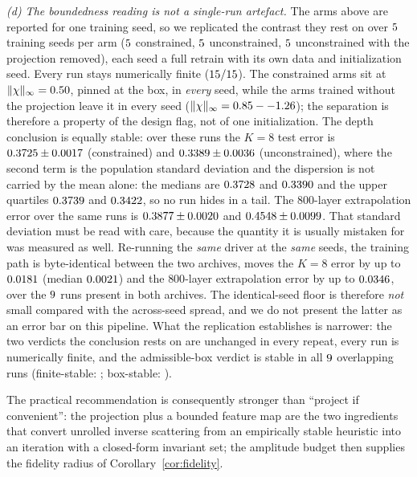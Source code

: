 \documentclass[journal,cmes,article,submit,moreauthors,pdftex]{Definitions/tsp}
\newcommand{\infn}[1]{\lVert #1 \rVert_{\infty}}
\newcommand{\numv}[1]{#1}
\begin{document}
\emph{(d) The boundedness reading is not a single-run artefact.} The arms above are reported for one
training seed, so we replicated the contrast they rest on over
$\numv{\NumSeedNCons}$ training seeds per arm ($\numv{\NumSeedNCons}$ constrained,
$\numv{\NumSeedNUnc}$ unconstrained, $\numv{\NumSeedNProjOff}$ unconstrained with the projection
removed), each seed a full retrain with its own data and initialization seed. Every run stays
numerically finite ($\numv{\NumSeedFinite}$). The constrained arms sit at
$\infn{\chi}=\numv{\NumSeedChiConsMax}$, pinned at the box, in \emph{every} seed, while the
arms trained without the projection leave it in every seed
($\infn{\chi}=\numv{\NumSeedProjOffBox}$); the separation is therefore a property of the design
flag, not of one initialization. The depth conclusion is equally stable: over these runs the
$K{=}8$ test error is $\numv{\NumSeedRreMeanCons}\pm\numv{\NumSeedRreSdCons}$ (constrained) and
$\numv{\NumSeedRreMeanUnc}\pm\numv{\NumSeedRreSdUnc}$ (unconstrained), where the second term is
the population standard deviation and the dispersion is not carried by the mean alone: the
medians are $\numv{\NumSeedRreMedCons}$ and $\numv{\NumSeedRreMedUnc}$ and the upper quartiles
$\numv{\NumSeedRreHiCons}$ and $\numv{\NumSeedRreHiUnc}$, so no run hides in a tail. The
$800$-layer extrapolation error over the same runs is
$\numv{\NumSeedExMeanCons}\pm\numv{\NumSeedExSdCons}$ and
$\numv{\NumSeedExMeanUnc}\pm\numv{\NumSeedExSdUnc}$. That standard deviation must be read with care, because the quantity it is usually mistaken for was measured as well. Re-running the \emph{same} driver at the
\emph{same} seeds, the training path is byte-identical between the two archives, moves
the $K{=}8$ error by up to $\numv{\NumRepFloorMaxRre}$ (median $\numv{\NumRepFloorMedRre}$) and the
$800$-layer extrapolation error by up to $\numv{\NumRepFloorMaxExtrap}$, over the
$\numv{\NumRepNShared}$ runs present in both archives. The identical-seed floor is therefore
\emph{not} small compared with the across-seed spread, and we do not present the latter as an error
bar on this pipeline. What the replication establishes is narrower: the two verdicts the conclusion rests on are unchanged in every repeat, every run is numerically finite, and the admissible-box
verdict is stable in all $\numv{\NumRepNShared}$ overlapping runs
(finite-stable: \numv{\NumRepFiniteStable}; box-stable: \numv{\NumRepBoxStable}).

The practical recommendation is consequently stronger than ``project if convenient'': the
projection plus a bounded feature map are the two ingredients that convert unrolled inverse
scattering from an empirically stable heuristic into an iteration with a closed-form invariant
set; the amplitude budget then supplies the fidelity radius of Corollary~\ref{cor:fidelity}.
\end{document}
